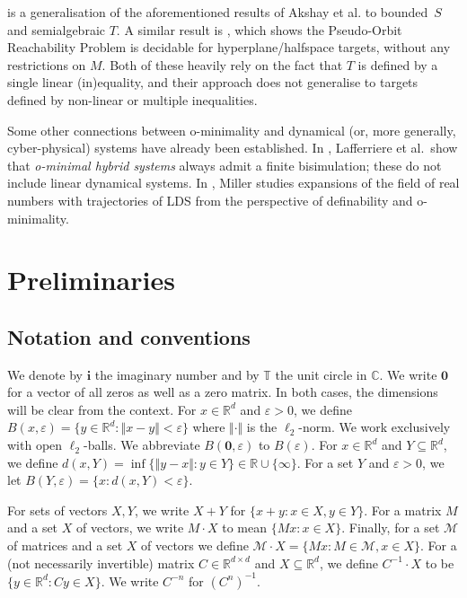 \documentclass[a4paper,UKenglish,cleveref]{lipics-v2021}
\newcommand{\torus}{\mathbb{T}}
\newcommand{\rel}{\mathbb{R}}
\newcommand{\com}{\mathbb{C}}
\newcommand{\Mcal}{\mathcal{M}}
\newcommand{\zerovec}{\mathbf{0}}
\newcommand{\im}{\bm{i}}
\begin{document}
 is a generalisation of the aforementioned results of Akshay et al. \cite{akshay2024robustness} to bounded~$S$ and semialgebraic $T$.
A similar result is \cite{d2021pseudo}, which shows the Pseudo-Orbit Reachability Problem is decidable for hyperplane/halfspace targets, without any restrictions on $M$.
Both of these heavily rely on the fact that $T$ is defined by a single linear (in)equality, and their approach does not generalise to targets defined by non-linear or multiple inequalities.

Some other connections between o-minimality and dynamical (or, more generally, cyber-physical) systems have already been established.
In \cite{lafferriere2000minimal}, Lafferriere et al.\ show that \emph{o-minimal hybrid systems} always admit a finite bisimulation; these do not include linear dynamical systems.
In \cite{miller2011expansions}, Miller studies expansions of the field of real numbers with trajectories of LDS from the perspective of definability and o-minimality.

\section{Preliminaries}

\subsection{Notation and conventions}

We denote by $\im$ the imaginary number and by $\torus$ the unit circle in $\com$.
We write $\zerovec$ for a vector of all zeros as well as a zero matrix.
In both cases, the dimensions will be clear from the context.
For $x\in\rel^d$ and $\varepsilon > 0$, we define $B(x,\varepsilon) = \{y\in\rel^d\colon \Vert x-y\Vert < \varepsilon\}$
where $\Vert\cdot\Vert$ is the $\ell_2$-norm.
We work exclusively with open $\ell_2$-balls.
We abbreviate $B(\zerovec,\varepsilon)$ to $B(\varepsilon)$.
For $x\in \rel^d$ and $Y\subseteq \rel^d$, we define $d(x,Y) = \inf \{\Vert y - x \Vert \colon y \in Y\} \in \rel \cup \{\infty\}$.
For a set $Y$ and $\varepsilon > 0$, we let $B(Y, \varepsilon) = \{x \colon d(x,Y) < \varepsilon\}$.

\label{weird-def}
For sets of vectors $X, Y$, we write $X+Y$ for $\{x + y \colon x \in X, y \in Y\}$.
For a matrix $M$ and a set $X$ of vectors, we write $M \cdot X$ to mean $\{Mx\colon x \in X\}$.
Finally, for a set $\Mcal$ of matrices and a set $X$ of vectors we define $\Mcal \cdot X = \{M x \colon M \in \Mcal, x \in X\}$.
For a (not necessarily invertible) matrix $C \in \rel^{d\times d}$ and $X \subseteq \rel^d$, we define  $C^{-1} \cdot X$ to be $\{y \in \rel^d \colon C y \in X\}$.
We write $C^{-n}$ for $(C^n)^{-1}$.
\end{document}
